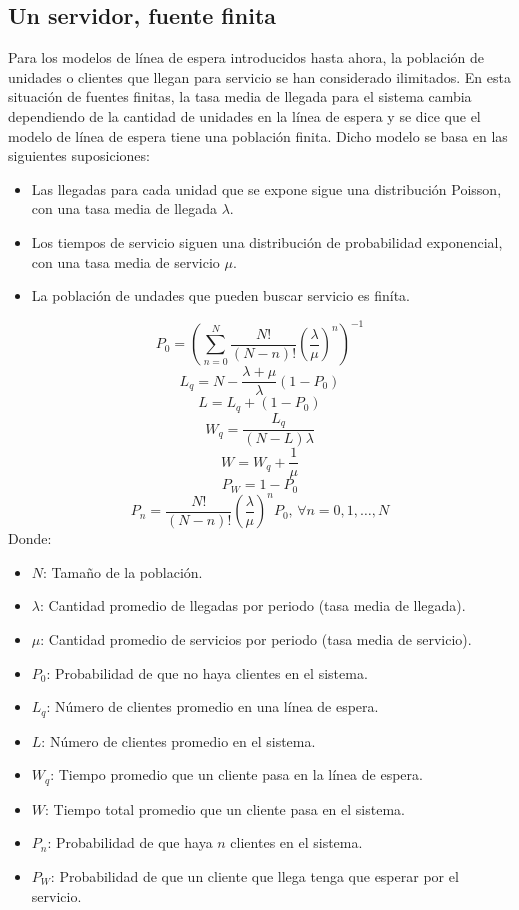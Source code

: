 \documentclass[letterpaper, 12pt]{article}
\begin{document}
    \subsection*{Un servidor, fuente finita}
    Para los modelos de línea de espera introducidos hasta ahora, la población de unidades o clientes que llegan para servicio se han considerado ilimitados. En esta situación de fuentes finitas, la tasa media de llegada para el sistema cambia dependiendo
    de la cantidad de unidades en la línea de espera y se dice que el modelo de línea de espera tiene una población finita. Dicho modelo se basa en las siguientes suposiciones:
    \begin{itemize}
        \item Las llegadas para cada unidad que se expone sigue una distribución Poisson, con una tasa media de llegada \(\lambda\).
        \item Los tiempos de servicio siguen una distribución de probabilidad exponencial, con una tasa media de servicio \(\mu\).
        \item La población de undades que pueden buscar servicio es finíta.
    \end{itemize}
    \[P_0=\left(\sum_{n=0}^N\frac{N!}{(N-n)!}\left(\frac{\lambda}{\mu}\right)^n\right)^{-1}\]
    \[L_q=N-\frac{\lambda+\mu}{\lambda}(1-P_0)\]
    \[L=L_q+(1-P_0)\]
    \[W_q=\frac{L_q}{(N-L)\lambda}\]
    \[W=W_q+\frac{1}{\mu}\]
    \[P_W=1-P_0\]
    \[P_n=\frac{N!}{(N-n)!}\left(\frac{\lambda}{\mu}\right)^nP_0,\,\forall n=0,1,\dots,N\]
    Donde:
    \begin{itemize}
        \item \(N\): Tamaño de la población.
        \item \(\lambda\): Cantidad promedio de llegadas por periodo (tasa media de llegada).
        \item \(\mu\): Cantidad promedio de servicios por periodo (tasa media de servicio).
        \item \(P_0\): Probabilidad de que no haya clientes en el sistema.
        \item \(L_q\): Número de clientes promedio en una línea de espera.
        \item \(L\): Número de clientes promedio en el sistema.
        \item \(W_q\): Tiempo promedio que un cliente pasa en la línea de espera.
        \item \(W\): Tiempo total promedio que un cliente pasa en el sistema.
        \item \(P_n\): Probabilidad de que haya \(n\) clientes en el sistema.
        \item \(P_W\): Probabilidad de que un cliente que llega tenga que esperar por el servicio.
    \end{itemize}
\end{document}
